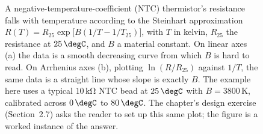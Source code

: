 \begin{figure}[htbp]
{\begin{tikzpicture}
\end{tikzpicture}%
}%
\caption[Thermistor calibration: linear vs Arrhenius axes]{A
negative-temperature-coefficient (NTC) thermistor's resistance falls
with temperature according to the Steinhart approximation
$R(T) = R_{25} \exp\bigl[B(1/T - 1/T_{25})\bigr]$, with $T$ in
kelvin, $R_{25}$ the resistance at $25\,\degC$, and $B$ a
material constant. On linear axes (a) the data is a smooth decreasing
curve from which $B$ is hard to read. On Arrhenius axes (b),
plotting $\ln(R/R_{25})$ against $1/T$, the same data is a straight
line whose slope is exactly $B$. The example here uses a typical
$10\,\si{\kilo\ohm}$ NTC bead at $25\,\degC$ with $B = 3800\,\si
{\kelvin}$, calibrated across $0\,\degC$ to $80\,\degC$. The
chapter's design exercise (Section~2.7) asks the reader to set up
this same plot; the figure is a worked instance of the answer.}
\label{fig:vol02:ch02:thermistor-fit}
\end{figure}

